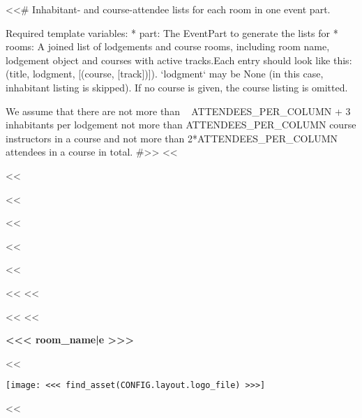 <<# Inhabitant- and course-attendee lists for each room in one event part.

    Required template variables:
    * part: The EventPart to generate the lists for
    * rooms: A joined list of lodgements and course rooms, including room name, lodgement object and courses with active
      tracks.Each entry should look like this: (title, lodgment, [(course, [track])]). `lodgment` may be None (in this
      case, inhabitant listing is skipped). If no course is given, the course listing is omitted.

    We assume that there are not more than ~ ATTENDEES_PER_COLUMN + 3 inhabitants per lodgement not more than
    ATTENDEES_PER_COLUMN course instructors in a course and not more than 2*ATTENDEES_PER_COLUMN attendees in a course
    in total.
#>>
<<%

<<%

<<%
    \usepackage{enumitem}
<<%

<<%
    \geometry{top=1cm,bottom=2cm,left=2cm,right=2cm,foot=1cm}

    \ifoot[]{}
    \ihead[]{}
    \ohead[]{\rightmark}
    \cfoot[]{}

<<%

<<%
<<%

<<%
    <<%
        \begin{minipage}[t][2cm][c]{\textwidth-3.5cm}%
            \vspace{0pt}
            \raggedright
            \headingfamily\bfseries\Large{}<<< room_name|e >>>
        \end{minipage}%
        \hspace{0.5cm}%
        <<%
            \begin{minipage}[t]{3cm}%
                \vspace{0pt}
                \raggedleft
                \texttt{[image: <<< find\_asset(CONFIG.layout.logo\_file) >>>]}
            \end{minipage}%
        <<%
        \renewcommand{\rightmark}{<<< room_name|e >>>}
        \thispagestyle{plain}

